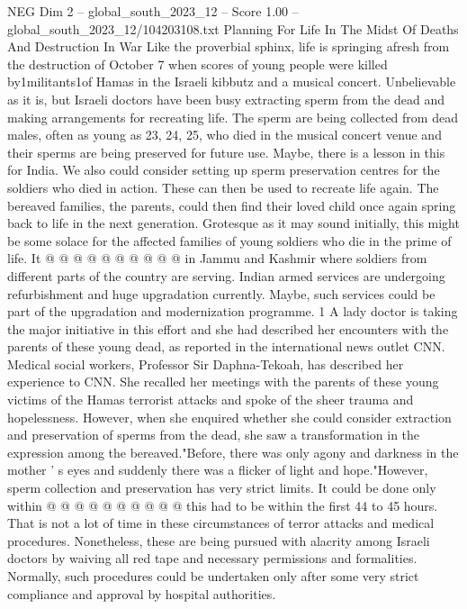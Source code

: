 \begin{textsample}{NEG Dim 2 – global\_south\_2023\_12 – Score 1.00 – global\_south\_2023\_12/104203108.txt}  \label{ex:f2_neg_293}
Planning For Life In The Midst Of Deaths And Destruction In War Like the proverbial sphinx, life is springing afresh from the destruction of October 7 when scores of young people were killed by1militants1of Hamas in the Israeli kibbutz and a musical concert.
Unbelievable as it is, but Israeli doctors have been busy extracting sperm from the dead and making arrangements for recreating life.
The sperm are being collected from dead males, often as young as 23, 24, 25, who died in the musical concert venue and their sperms are being preserved for future use.
Maybe, there is a lesson in this for India.
We also could consider setting up sperm preservation centres for the soldiers who died in action.
These can then be used to recreate life again.
The bereaved families, the parents, could then find their loved child once again spring back to life in the next generation.
Grotesque as it may sound initially, this might be some solace for the affected families of young soldiers who die in the prime of life.
It @ @ @ @ @ @ @ @ @ @ in Jammu and Kashmir where soldiers from different parts of the country are serving.
Indian armed services are undergoing refurbishment and huge upgradation currently.
Maybe, such services could be part of the upgradation and modernization programme. 1 A lady doctor is taking the major initiative in this effort and she had described her encounters with the parents of these young dead, as reported in the international news outlet CNN.
Medical social workers, Professor Sir Daphna-Tekoah, has described her experience to CNN.
She recalled her meetings with the parents of these young victims of the Hamas terrorist attacks and spoke of the sheer trauma and hopelessness.
However, when she enquired whether she could consider extraction and preservation of sperms from the dead, she saw a transformation in the expression among the bereaved."Before, there was only agony and darkness in the mother ' s eyes and suddenly there was a flicker of light and hope."However, sperm collection and preservation has very strict limits.
It could be done only within @ @ @ @ @ @ @ @ @ @ this had to be within the first 44 to 45 hours.
That is not a lot of time in these circumstances of terror attacks and medical procedures.
Nonetheless, these are being pursued with alacrity among Israeli doctors by waiving all red tape and necessary permissions and formalities.
Normally, such procedures could be undertaken only after some very strict compliance and approval by hospital authorities.

\end{textsample}
